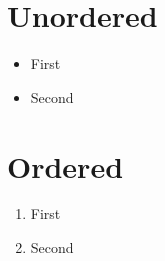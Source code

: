 \documentclass{article}
\begin{document}
\section{Unordered}
\begin{itemize}
  \item First
  \item Second
\end{itemize}

\section{Ordered}
\begin{enumerate}
  \item First
  \item Second
\end{enumerate}
\end{document}
